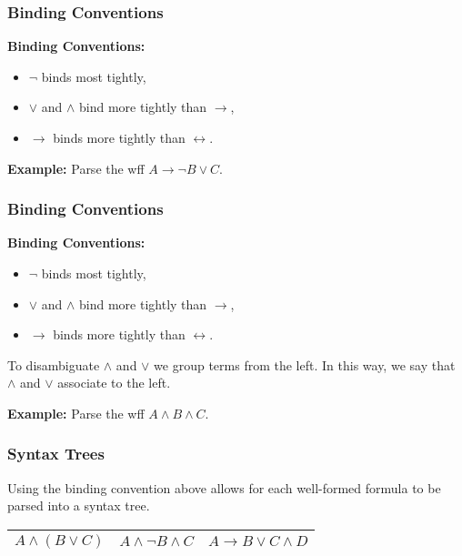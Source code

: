 \documentclass{beamer}
\begin{document}
\begin{frame}
	\frametitle{Binding Conventions}
			
	{\bf Binding Conventions:} %
	\begin{itemize}
		\item $\lnot$ binds most tightly, 
		\item $\lor$ and $\land$ bind more tightly than $\rightarrow$,
		\item $\rightarrow$ binds more tightly than $\leftrightarrow$. 			
	\end{itemize}

	\vspace{0.2cm}

	{\bf Example:} Parse the wff $A \to \lnot B \lor C$.

	\vspace{2cm}

\end{frame}

\begin{frame}
	\frametitle{Binding Conventions}
			
	{\bf Binding Conventions:} %
	\begin{itemize}
		\item $\lnot$ binds most tightly, 
		\item $\lor$ and $\land$ bind more tightly than $\rightarrow$,
		\item $\rightarrow$ binds more tightly than $\leftrightarrow$. 			
	\end{itemize}

	To disambiguate $\land$ and $\lor$ we group terms from the left. In this way, we say that $\land$ and $\lor$ associate to the left. 

	{\bf Example:} Parse the wff $A \land B \land C$.

	\vspace{2cm}

\end{frame}

\begin{frame}
	\frametitle{Syntax Trees}

	Using the binding convention above allows for each well-formed formula to be parsed into a syntax tree. 

	\begin{table}[h]
		\centering
		\begin{tabular}{c c c}
			$A \land (B \lor C)$ \hspace{1.5cm} & $A \land \lnot B \land C$ \hspace{1cm} & $A \to B \lor C \land D$ \\
			\hline
		\end{tabular}
	\end{table}
	\vspace{4cm}
\end{frame}
\end{document}
